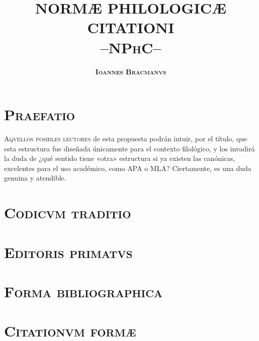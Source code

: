 \documentclass[11pt,twoside]{article}
\title{\huge \textbf{NORMÆ PHILOLOGICÆ CITATIONI}\\ \textsc{\huge\textbf{--NPhC--}}}
\date{}
\author{\huge\textsc{\textbf{Ioannes Bracmanvs}}}
\newcommand{\head}[1]{\def\myhead{#1}\thispagestyle{empty}} \def\myhead{}
\begin{document}
		{
		\maketitle
	}
	\newpage
%
\head{\textsc{praefatio}}
\section*{\centering\textsc{Praefatio}}
%
\lettrine[lines=2,nindent=0pt]{A}{\textsc{qvellos posibles lectores}} de esta propuesta podrán intuir, por el título, que esta estructura fue diseñada únicamente para el contexto filológico, y los invadirá la duda de ¿qué sentido tiene «otra» estructura si ya existen las canónicas, excelentes para el uso académico, como APA o MLA? Ciertamente, es una duda genuina y atendible.
%
\section*{\centering\textsc{Codicvm traditio}}
%
%
\section*{\centering\textsc{Editoris primatvs}}
%
%
\section*{\centering\textsc{Forma bibliographica}}
%
%
\section*{\centering\textsc{Citationvm formæ}}
%
%
\end{document}
